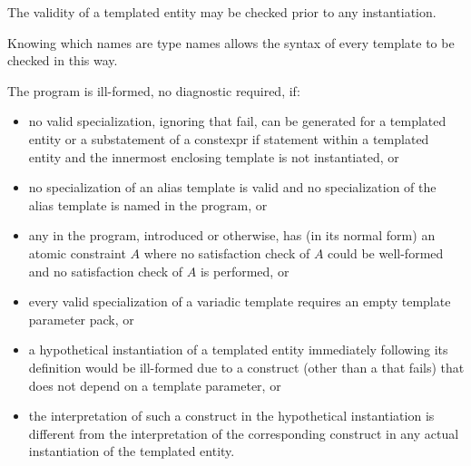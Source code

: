\pnum
{}%
%
The validity of a templated entity may be checked prior to any instantiation.
\begin{note}
Knowing which names are type names allows the syntax of every template
to be checked in this way.
\end{note}
The program is ill-formed, no diagnostic required, if:
\begin{itemize}
\item
no valid specialization,
ignoring  that fail,
can be generated for a templated entity
or a substatement of a constexpr if statement
within a templated entity
and the innermost enclosing template is not instantiated, or
\item
no specialization of an alias template is valid and
no specialization of the alias template is named in the program, or
\item
any  in the program, introduced or otherwise,
has (in its normal form) an atomic constraint $A$ where
no satisfaction check of $A$ could be well-formed and
no satisfaction check of $A$ is performed, or
\item
every valid specialization of a variadic template requires an empty template
parameter pack, or
\item
a hypothetical instantiation of a templated entity
immediately following its definition
would be ill-formed
due to a construct
(other than a  that fails)
that does not depend on a template parameter, or
\item
the interpretation of such a construct
in the hypothetical instantiation
is different from
the interpretation of the corresponding construct
in any actual instantiation of the templated entity.
\end{itemize}
